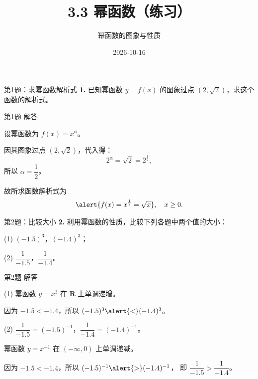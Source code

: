 \documentclass[10pt,aspectratio=169,serif]{beamer}
\title[幂函数练习]{3.3 幂函数（练习）}
\subtitle{幂函数的图象与性质}
\author{}
\institute{}
\date{2026-10-16}
\begin{document}
\begin{frame}
  \titlepage
\end{frame}

\begin{frame}[t]{第1题：求幂函数解析式}
\textbf{1.} 已知幂函数 $y=f(x)$ 的图象过点 $(2,\sqrt{2})$，求这个函数的解析式。
\end{frame}

\begin{frame}[t]{第1题 解答}
\begin{tcolorbox}[colback=orange!10,colframe=orange,title=\textbf{解}]
设幂函数为 $f(x)=x^{\alpha}$。

\vspace{0.3em}
因其图象过点 $(2,\sqrt{2})$，代入得：
\[
2^{\alpha}=\sqrt{2}=2^{\frac12},
\]
所以 $\alpha=\dfrac12$。

\vspace{0.5em}
故所求函数解析式为
\[
\alert{f(x)=x^{\frac12}=\sqrt{x}},\quad x\ge 0.
\]
\end{tcolorbox}
\end{frame}

\begin{frame}[t]{第2题：比较大小}
\textbf{2.} 利用幂函数的性质，比较下列各题中两个值的大小：

\vspace{0.5em}
(1) $(-1.5)^3$，$(-1.4)^3$；

\vspace{0.5em}
(2) $\dfrac{1}{-1.5}$，$\dfrac{1}{-1.4}$。
\end{frame}

\begin{frame}[t]{第2题 解答}
\begin{tcolorbox}[colback=orange!10,colframe=orange,title=\textbf{解}]
(1) 幂函数 $y=x^3$ 在 $\mathbf{R}$ 上单调递增。

\vspace{0.3em}
因为 $-1.5<-1.4$，所以 $(-1.5)^3\alert{<}(-1.4)^3$。

\vspace{0.8em}
(2) $\dfrac{1}{-1.5}=(-1.5)^{-1}$，$\dfrac{1}{-1.4}=(-1.4)^{-1}$。

\vspace{0.3em}
幂函数 $y=x^{-1}$ 在 $(-\infty,0)$ 上单调递减。

\vspace{0.3em}
因为 $-1.5<-1.4$，所以 $(-1.5)^{-1}\alert{>}(-1.4)^{-1}$，
即 $\dfrac{1}{-1.5}>\dfrac{1}{-1.4}$。
\end{tcolorbox}
\end{frame}
\end{document}
